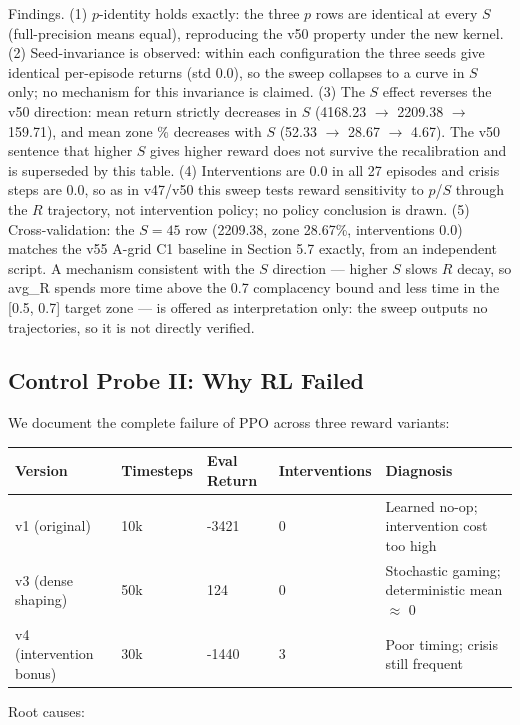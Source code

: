 \documentclass[11pt]{article}
\begin{document}
Findings. (1) $p$-identity holds exactly: the three $p$ rows are identical at every $S$ (full-precision means equal), reproducing the v50 property under the new kernel. (2) Seed-invariance is observed: within each configuration the three seeds give identical per-episode returns (std 0.0), so the sweep collapses to a curve in $S$ only; no mechanism for this invariance is claimed. (3) The $S$ effect reverses the v50 direction: mean return strictly decreases in $S$ (4168.23 $\rightarrow$ 2209.38 $\rightarrow$ 159.71), and mean zone \% decreases with $S$ (52.33 $\rightarrow$ 28.67 $\rightarrow$ 4.67). The v50 sentence that higher $S$ gives higher reward does not survive the recalibration and is superseded by this table. (4) Interventions are 0.0 in all 27 episodes and crisis steps are 0.0, so as in v47/v50 this sweep tests reward sensitivity to $p$/$S$ through the $R$ trajectory, not intervention policy; no policy conclusion is drawn. (5) Cross-validation: the $S=45$ row (2209.38, zone 28.67\%, interventions 0.0) matches the v55 A-grid C1 baseline in Section 5.7 exactly, from an independent script. A mechanism consistent with the $S$ direction --- higher $S$ slows $R$ decay, so avg\_R spends more time above the 0.7 complacency bound and less time in the [0.5, 0.7] target zone --- is offered as interpretation only: the sweep outputs no trajectories, so it is not directly verified.

\subsection{Control Probe II: Why RL Failed}
We document the complete failure of PPO across three reward variants:

\begin{table}[htbp]
\centering
\begin{tabular}{lllll}
\toprule
\textbf{Version} & \textbf{Timesteps} & \textbf{Eval Return} & \textbf{Interventions} & \textbf{Diagnosis} \\
\midrule
v1 (original) & 10k & -3421 & 0 & Learned no-op; intervention cost too high \\
v3 (dense shaping) & 50k & 124 & 0 & Stochastic gaming; deterministic mean $\approx$ 0 \\
v4 (intervention bonus) & 30k & -1440 & 3 & Poor timing; crisis still frequent \\
\bottomrule
\end{tabular}
\end{table}

Root causes:
\end{document}
